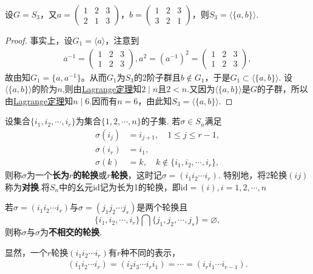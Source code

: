 \documentclass[../../main.tex]{subfiles}%
\begin{document}
\begin{example}
设$G = S_3$，又$a = \begin{pmatrix} 1 & 2 & 3 \\ 2 & 1 & 3 \end{pmatrix}$，$b = \begin{pmatrix} 1 & 2 & 3 \\ 3 & 2 & 1 \end{pmatrix}$，则$S_3 = \langle \{a, b\} \rangle$.
\end{example}
\begin{proof}

事实上，设$G_1 = \langle a\rangle$，注意到
\begin{align*}
a^{-1}=\begin{pmatrix}1&2&3\\1&2&3\end{pmatrix},a^2=(a^{-1})^2=\begin{pmatrix}1&2&3\\1&2&3\end{pmatrix},
\end{align*}
故由知$G_1=\{a,a^{-1}\}$。从而$G_1$为$S_3$的2阶子群且$b \notin G_1$，于是$G_1 \subset \langle \{a, b\} \rangle$. 设$\langle \{a, b\} \rangle$的阶为$n$,则由\hyperref[theorem:抽象代数--Lagrange定理]{Lagrange定理}知$2\mid n$且$2 < n$.又因为$\langle \{a, b\} \rangle$是$G$的子群，所以
由\hyperref[theorem:抽象代数--Lagrange定理]{Lagrange定理}知$n\mid 6$.因而有$n = 6$，由此知$S_3 = \langle \{a, b\} \rangle$.

\end{proof}

\begin{definition}
设集合$\{i_1, i_2, \cdots, i_r\}$为集合$\{1, 2, \cdots, n\}$的子集. 若$\sigma \in S_n$满足
\begin{align*}
\sigma(i_j) &= i_{j+1}, \quad 1 \leqslant j \leqslant r-1, \\
\sigma(i_r) &= i_1, \\
\sigma(k) &= k, \quad k \notin \{i_1, i_2, \cdots, i_r\},
\end{align*}
则称$\sigma$为一个\textbf{长为$r$的轮换}或\textbf{$r$轮换}，这时记$\sigma = (i_1 i_2 \cdots i_r)$.
特别地，将2轮换$(ij)$称为\textbf{对换}.将$S_n$中的幺元$\text{id}$记为长为1的轮换，即$\text{id} = (i),i=1,2,\cdots,n$

若$\sigma = (i_1 i_2 \cdots i_r)$与$\sigma = (j_1 j_2 \cdots j_s)$是两个轮换且
$$\{i_1, i_2, \cdots, i_r\} \bigcap \{j_1, j_2, \cdots, j_s\} = \varnothing,$$
则称$\sigma$与$\sigma$为\textbf{不相交的轮换}.

显然，一个$r$轮换$(i_1 i_2 \cdots i_r)$有$r$种不同的表示，
\begin{align*}
(i_1 i_2 \cdots i_r) = (i_2 i_3 \cdots i_r i_1) = \cdots = (i_r i_1 \cdots i_{r-1}).
\end{align*}
\end{definition}
\end{document}
